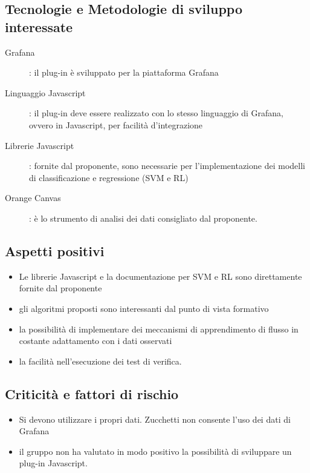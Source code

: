 \documentclass[../studio-di-fattibilita.tex]{subfiles}
\begin{document}
  \subsection{Tecnologie e Metodologie di sviluppo interessate}%
  \label{subsec:tecnologie_interessate}
  \begin{description}
    \item [Grafana]: il plug-in è sviluppato per la piattaforma Grafana
    \item [Linguaggio Javascript]: il plug-in deve essere realizzato con lo stesso linguaggio di Grafana, ovvero in Javascript, per facilità d'integrazione
    \item [Librerie Javascript]: fornite dal proponente, sono necessarie per l'implementazione dei modelli di classificazione e regressione (SVM e RL)
    \item [Orange Canvas]: è lo strumento di analisi dei dati consigliato dal proponente.
  \end{description}


  \subsection{Aspetti positivi}%
  \label{subsec:aspetti_positivi}
  \begin{itemize}
    \item Le librerie Javascript e la documentazione per SVM e RL sono direttamente fornite dal proponente
    \item gli algoritmi proposti sono interessanti dal punto di vista formativo
    \item la possibilità di implementare dei meccanismi di apprendimento di flusso in costante adattamento con i dati osservati
    \item la facilità nell'esecuzione dei test di verifica.
  \end{itemize}


  \subsection{Criticità e fattori di rischio}%
  \label{subsec:criticita_e_fattori_di_rischio}
  \begin{itemize}
    \item Si devono utilizzare i propri dati. Zucchetti non consente l'uso dei dati di Grafana
    \item il gruppo non ha valutato in modo positivo la possibilità di sviluppare un plug-in Javascript.
  \end{itemize}
\end{document}
